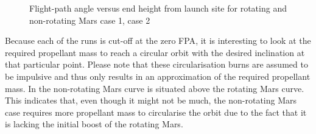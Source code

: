 \begin{figure}[H]
\centering
{} 
\caption{Flight-path angle versus end height from launch site for rotating and non-rotating Mars \protect{} case 1,  \protect{} case 2 } 
\label{fig:FPAvsHeightFromLaunchSiteCase1combined} 
\end{figure}


\noindent
Because each of the runs is cut-off at the zero \ac{FPA}, it is interesting to look at the required propellant mass to reach a circular orbit with the desired inclination at that particular point. Please note that these circularisation burns are assumed to be impulsive and thus only results in an approximation of the required propellant mass. In  the non-rotating Mars curve is situated above the rotating Mars curve. This indicates that, even though it might not be much, the non-rotating Mars case requires more propellant mass to circularise the orbit due to the fact that it is lacking the initial boost of the rotating Mars.


